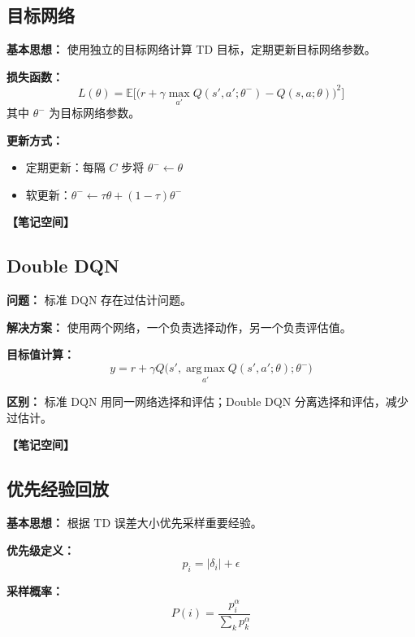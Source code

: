 \documentclass[12pt,a4paper]{article}
\newcommand{\notespace}[1][3cm]{%
  \vspace{#1}%
  \noindent\textbf{【笔记空间】}%
  \vspace{#1}%
}
\newcommand{\E}{\mathbb{E}}
\newcommand{\1}{\mathbf{1}}
\newcommand{\argmax}{\operatorname*{arg\,max}}
\begin{document}
\subsection{目标网络}

\textbf{基本思想：} 使用独立的目标网络计算 TD 目标，定期更新目标网络参数。

\textbf{损失函数：}
\begin{equation}
L(\theta)=\E\bigl[\bigl(r+\gamma\max_{a'}Q(s',a';\theta^-)-Q(s,a;\theta)\bigr)^2\bigr]
\end{equation}
其中 $\theta^-$ 为目标网络参数。

\textbf{更新方式：}
\begin{itemize}[leftmargin=2em]
  \item 定期更新：每隔 $C$ 步将 $\theta^- \leftarrow \theta$
  \item 软更新：$\theta^- \leftarrow \tau\theta+(1-\tau)\theta^-$
\end{itemize}

\notespace[2cm]

\subsection{Double DQN}

\textbf{问题：} 标准 DQN 存在过估计问题。

\textbf{解决方案：} 使用两个网络，一个负责选择动作，另一个负责评估值。

\textbf{目标值计算：}
\begin{equation}
y=r+\gamma Q\bigl(s',\argmax_{a'}Q(s',a';\theta);\theta^- \bigr)
\end{equation}

\begin{notebox}
\textbf{区别：} 标准 DQN 用同一网络选择和评估；Double DQN 分离选择和评估，减少过估计。
\end{notebox}

\notespace[2cm]

\subsection{优先经验回放}

\textbf{基本思想：} 根据 TD 误差大小优先采样重要经验。

\textbf{优先级定义：}
\begin{equation}
p_i=|\delta_i|+\epsilon
\end{equation}

\textbf{采样概率：}
\begin{equation}
P(i)=\frac{p_i^\alpha}{\sum_k p_k^\alpha}
\end{equation}
\end{document}
